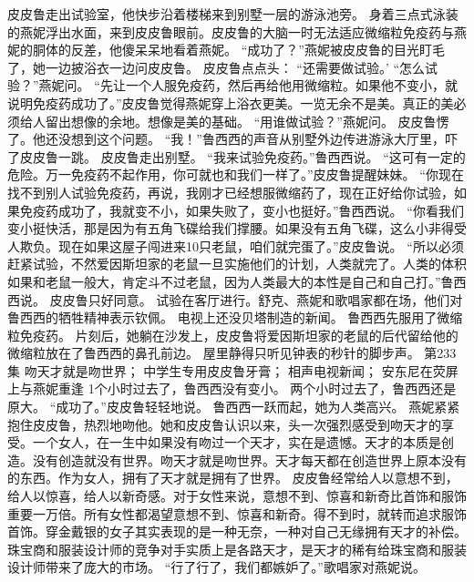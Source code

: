 \documentclass[a4paper,12pt,UTF8,twoside]{ctexbook}
\begin{document}
        皮皮鲁走出试验室，他快步沿着楼梯来到别墅一层的游泳池旁。  
        身着三点式泳装的燕妮浮出水面，来到皮皮鲁眼前。皮皮鲁的大脑一时无法适应微缩粒免疫药与燕妮的胴体的反差，他傻呆呆地看着燕妮。  
        “成功了？”燕妮被皮皮鲁的目光盯毛了，她一边披浴衣一边问皮皮鲁。  
        皮皮鲁点点头：  
        “还需要做试验。’  
        “怎么试验？”燕妮问。  
        “先让一个人服免疫药，然后再给他用微缩粒。如果他不变小，就说明免疫药成功了。”皮皮鲁觉得燕妮穿上浴衣更美。一览无余不是美。真正的美必须给人留出想像的余地。想像是美的基础。  
        “用谁做试验？”燕妮问。  
        皮皮鲁愣了。他还没想到这个问题。  
        “我！”鲁西西的声音从别墅外边传进游泳大厅里，吓了皮皮鲁一跳。  
        皮皮鲁走出别墅。  
        “我来试验免疫药。”鲁西西说。  
        “这可有一定的危险。万一免疫药不起作用，你可就也和我们一样了。”皮皮鲁提醒妹妹。  
        “你现在找不到别人试验免疫药，再说，我刚才已经想服微缩药了，现在正好给你试验，如果免疫药成功了，我就变不小，如果失败了，变小也挺好。”鲁西西说。  
        “你看我们变小挺快活，那是因为有五角飞碟给我们撑腰。如果没有五角飞碟，这么小非得受人欺负。现在如果这屋子闯进来10只老鼠，咱们就完蛋了。”皮皮鲁说。  
        “所以必须赶紧试验，不然爱因斯坦家的老鼠一旦实施他们的计划，人类就完了。人类的体积如果和老鼠一般大，肯定斗不过老鼠，因为人类最大的本性是自己和自己打。”鲁西西说。  
        皮皮鲁只好同意。  
        试验在客厅进行。舒克、燕妮和歌唱家都在场，他们对鲁西西的牺牲精神表示钦佩。  
        电视上还没贝塔制造的新闻。  
        鲁西西先服用了微缩粒免疫药。  
        片刻后，她躺在沙发上，皮皮鲁将爱因斯坦家的老鼠的后代留给他的微缩粒放在了鲁西西的鼻孔前边。  
        屋里静得只听见钟表的秒针的脚步声。          第233集  
        吻天才就是吻世界；  
        中学生专用皮皮鲁牙膏；  
        相声电视新闻；  
        安东尼在荧屏上与燕妮重逢    
        1个小时过去了，鲁西西没有变小。  
        两个小时过去了，鲁西西还是原大。  
        “成功了。”皮皮鲁轻轻地说。  
        鲁西西一跃而起，她为人类高兴。  
        燕妮紧紧抱住皮皮鲁，热烈地吻他。她和皮皮鲁认识以来，头一次强烈感受到吻天才的享受。一个女人，在一生中如果没有吻过一个天才，实在是遗憾。天才的本质是创造。没有创造就没有世界。吻天才就是吻世界。天才每天都在创造世界上原本没有的东西。作为女人，拥有了天才就是拥有了世界。        
        皮皮鲁经常给人以意想不到，给人以惊喜，给人以新奇感。对于女性来说，意想不到、惊喜和新奇比首饰和服饰重要一万倍。所有女性都渴望意想不到、惊喜和新奇。得不到时，就转而追求服饰首饰。穿金戴银的女子其实表现的是一种无奈，一种对自己无缘拥有天才的补偿。珠宝商和服装设计师的竞争对手实质上是各路天才，是天才的稀有给珠宝商和服装设计师带来了庞大的市场。  
        “行了行了，我们都嫉妒了。”歌唱家对燕妮说。  
\end{document}
